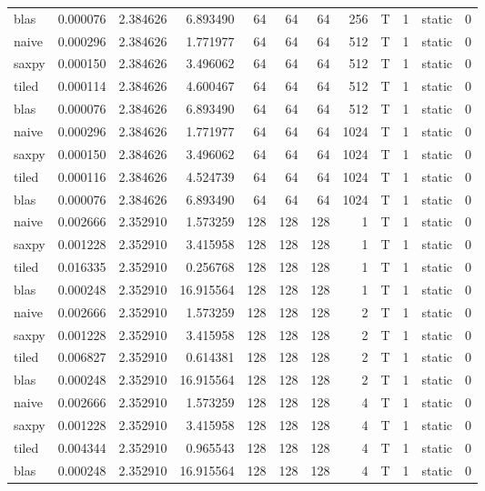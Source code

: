 \documentclass[
  12pt,
  xcolor = usenames,dvipsnames]{article}
\begin{document}
\begin{table}[!h]
{\begin{tabular}[t]{lrrrrrrrlrlr}
\addlinespace
blas & 0.000076 & 2.384626 & 6.893490 & 64 & 64 & 64 & 256 & T & 1 & static & 0\\
naive & 0.000296 & 2.384626 & 1.771977 & 64 & 64 & 64 & 512 & T & 1 & static & 0\\
saxpy & 0.000150 & 2.384626 & 3.496062 & 64 & 64 & 64 & 512 & T & 1 & static & 0\\
tiled & 0.000114 & 2.384626 & 4.600467 & 64 & 64 & 64 & 512 & T & 1 & static & 0\\
blas & 0.000076 & 2.384626 & 6.893490 & 64 & 64 & 64 & 512 & T & 1 & static & 0\\
\addlinespace
naive & 0.000296 & 2.384626 & 1.771977 & 64 & 64 & 64 & 1024 & T & 1 & static & 0\\
saxpy & 0.000150 & 2.384626 & 3.496062 & 64 & 64 & 64 & 1024 & T & 1 & static & 0\\
tiled & 0.000116 & 2.384626 & 4.524739 & 64 & 64 & 64 & 1024 & T & 1 & static & 0\\
blas & 0.000076 & 2.384626 & 6.893490 & 64 & 64 & 64 & 1024 & T & 1 & static & 0\\
naive & 0.002666 & 2.352910 & 1.573259 & 128 & 128 & 128 & 1 & T & 1 & static & 0\\
\addlinespace
saxpy & 0.001228 & 2.352910 & 3.415958 & 128 & 128 & 128 & 1 & T & 1 & static & 0\\
tiled & 0.016335 & 2.352910 & 0.256768 & 128 & 128 & 128 & 1 & T & 1 & static & 0\\
blas & 0.000248 & 2.352910 & 16.915564 & 128 & 128 & 128 & 1 & T & 1 & static & 0\\
naive & 0.002666 & 2.352910 & 1.573259 & 128 & 128 & 128 & 2 & T & 1 & static & 0\\
saxpy & 0.001228 & 2.352910 & 3.415958 & 128 & 128 & 128 & 2 & T & 1 & static & 0\\
\addlinespace
tiled & 0.006827 & 2.352910 & 0.614381 & 128 & 128 & 128 & 2 & T & 1 & static & 0\\
blas & 0.000248 & 2.352910 & 16.915564 & 128 & 128 & 128 & 2 & T & 1 & static & 0\\
naive & 0.002666 & 2.352910 & 1.573259 & 128 & 128 & 128 & 4 & T & 1 & static & 0\\
saxpy & 0.001228 & 2.352910 & 3.415958 & 128 & 128 & 128 & 4 & T & 1 & static & 0\\
tiled & 0.004344 & 2.352910 & 0.965543 & 128 & 128 & 128 & 4 & T & 1 & static & 0\\
\addlinespace
blas & 0.000248 & 2.352910 & 16.915564 & 128 & 128 & 128 & 4 & T & 1 & static & 0\\

\end{tabular}}
\end{table}
\end{document}
